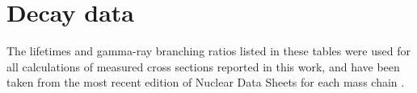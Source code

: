 
\section{Decay data} \label{data}
% 
The   lifetimes and gamma-ray branching ratios  listed in these tables were used for all calculations of measured cross sections reported in this work, and have been taken from the most recent edition of  Nuclear Data Sheets for each  mass chain  \cite{Basunia2015,Firestone2007,Wang2017,Dong2015,Dong2014,JUNDE2008787,Junde2011,Bhat1998,Nesaraja2010,BAGLIN2002,Browne2013,Zuber20151,NICHOLS2012973,Singh2007,Browne2010,Tuli2003,McCutchan2015,Singh2014,NEGRET20151,Johnson2015,McCutchan2014,Singh2013,Browne1997,Baglin2013,Baglin2012,Baglin2011}. 





